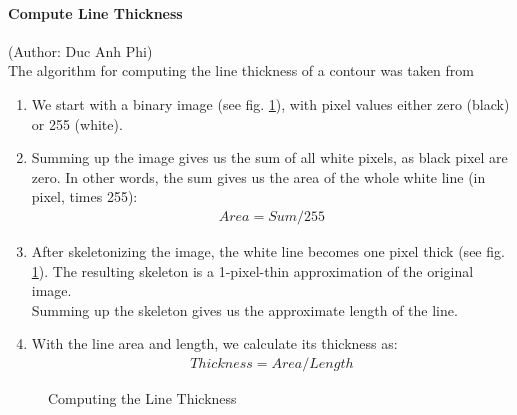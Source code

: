 \documentclass[11pt]{article}
\begin{document}
	\paragraph{Compute Line Thickness}
	\small{(Author: Duc Anh Phi)}\\
	The algorithm for computing the line thickness of a contour was taken from \cite{stackexchange}
	\begin{enumerate}
		\item We start with a binary image (see fig. \ref{fig:linethickness}), with pixel values either zero (black) or 255 (white).
		\item Summing up the image gives us the sum of all white pixels, as black pixel are zero. In other words, the sum gives us the area of the whole white line (in pixel, times 255):
		\begin{align}
		Area = Sum/255
		\end{align}
		\item After skeletonizing the image, the white line becomes one pixel thick (see fig. \ref{fig:linethickness}). The resulting skeleton is a 1-pixel-thin approximation of the original image.\\
		Summing up the skeleton gives us the approximate length of the line.
		\item With the line area and length, we calculate its thickness as:
		\begin{align}
		Thickness = Area / Length
		\end{align}
	\end{enumerate}

	\begin{figure}[h!]
		\centering
		\quad
		
		\caption{Computing the Line Thickness}
		\label{fig:linethickness}
	\end{figure}
	
\end{document}
